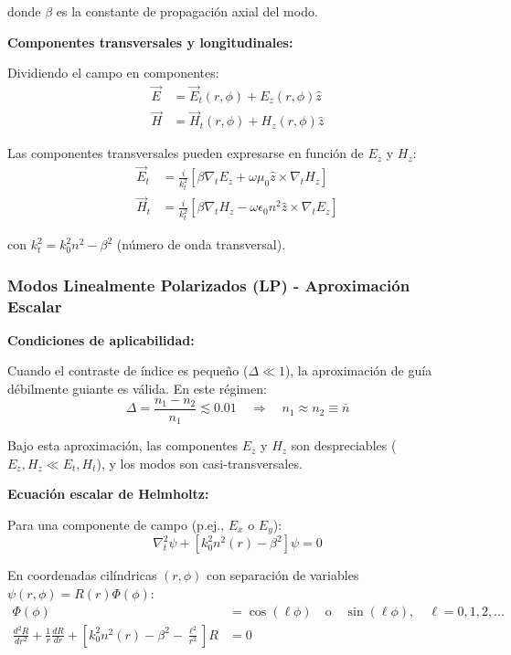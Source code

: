 \documentclass[11pt,a4paper]{article}
\begin{document}
donde $\beta$ es la constante de propagación axial del modo.

\textbf{Componentes transversales y longitudinales:}

Dividiendo el campo en componentes:
\begin{align}
    \vec{E} &= \vec{E}_t(r,\phi) + E_z(r,\phi)\hat{z}\\
    \vec{H} &= \vec{H}_t(r,\phi) + H_z(r,\phi)\hat{z}
\end{align}

Las componentes transversales pueden expresarse en función de $E_z$ y $H_z$:
\begin{align}
    \vec{E}_t &= \frac{i}{k_t^2}[\beta\nabla_t E_z + \omega\mu_0\hat{z} \times \nabla_t H_z] \label{eq:Et}\\
    \vec{H}_t &= \frac{i}{k_t^2}[\beta\nabla_t H_z - \omega\epsilon_0 n^2\hat{z} \times \nabla_t E_z] \label{eq:Ht}
\end{align}

con $k_t^2 = k_0^2 n^2 - \beta^2$ (número de onda transversal).

\subsubsection{Modos Linealmente Polarizados (LP) - Aproximación Escalar}

\textbf{Condiciones de aplicabilidad:}

Cuando el contraste de índice es pequeño ($\Delta \ll 1$), la aproximación de guía débilmente guiante es válida. En este régimen:
\begin{equation}
    \Delta = \frac{n_1 - n_2}{n_1} \lesssim 0.01 \quad \Rightarrow \quad n_1 \approx n_2 \equiv \bar{n}
\end{equation}

Bajo esta aproximación, las componentes $E_z$ y $H_z$ son despreciables ($E_z, H_z \ll E_t, H_t$), y los modos son casi-transversales.

\textbf{Ecuación escalar de Helmholtz:}

Para una componente de campo (p.ej., $E_x$ o $E_y$):
\begin{equation}
    \nabla_t^2 \psi + [k_0^2 n^2(r) - \beta^2]\psi = 0
\end{equation}

En coordenadas cilíndricas $(r, \phi)$ con separación de variables $\psi(r,\phi) = R(r)\Phi(\phi)$:
\begin{align}
    \Phi(\phi) &= \cos(\ell\phi) \quad \text{o} \quad \sin(\ell\phi), \quad \ell = 0, 1, 2, \ldots\\
    \frac{d^2R}{dr^2} + \frac{1}{r}\frac{dR}{dr} + \left[k_0^2n^2(r) - \beta^2 - \frac{\ell^2}{r^2}\right]R &= 0
\end{align}
\end{document}
